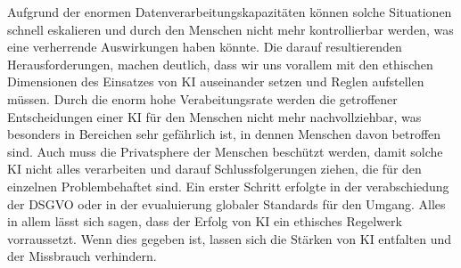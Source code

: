 Aufgrund der enormen Datenverarbeitungskapazitäten können solche Situationen schnell eskalieren und durch den Menschen nicht mehr kontrollierbar werden, was eine verherrende
Auswirkungen haben könnte.
Die darauf resultierenden Herausforderungen, machen deutlich, dass wir uns vorallem mit den ethischen Dimensionen des Einsatzes von \ac{KI} auseinander setzen und Reglen aufstellen müssen.
Durch die enorm hohe Verabeitungsrate werden die getroffener Entscheidungen einer \ac{KI} für den Menschen nicht mehr nachvollziehbar, was besonders in Bereichen sehr gefährlich ist, in dennen
Menschen davon betroffen sind. 
Auch muss die Privatsphere der Menschen beschützt werden, damit solche \ac{KI} nicht alles verarbeiten und darauf Schlussfolgerungen ziehen, die für den einzelnen Problembehaftet sind. Ein erster
Schritt erfolgte in der verabschiedung der \ac{DSGVO} oder in der evualuierung globaler Standards für den Umgang.
Alles in allem lässt sich sagen, dass der Erfolg von \ac{KI} ein ethisches Regelwerk vorraussetzt. Wenn dies gegeben ist, lassen sich die Stärken von \ac{KI} entfalten und der Missbrauch
verhindern. 